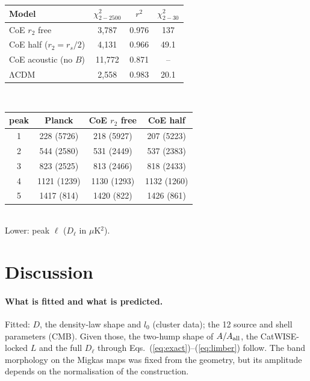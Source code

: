 \documentclass[10pt,twocolumn]{article}
\begin{document}
\par\medskip\noindent\begin{minipage}{\columnwidth}\centering\footnotesize\setlength{\tabcolsep}{4pt}
\label{tab:fit}
\begin{tabular}{lccc}\toprule
Model & $\chi^2_{2-2500}$ & $r^2$ & $\chi^2_{2-30}$\\\midrule
CoE $r_2$ free & 3{,}787 & 0.976 & 137\\
CoE half ($r_2=r_s/2$) & 4{,}131 & 0.966 & 49.1\\
CoE acoustic (no $B$) & 11{,}772 & 0.871 & --\\
ΛCDM & 2{,}558 & 0.983 & 20.1\\\bottomrule
\end{tabular}\\[6pt]
\begin{tabular}{cccc}\toprule
peak & Planck & CoE $r_2$ free & CoE half\\\midrule
1&228 (5726)&218 (5927)&207 (5223)\\
2&544 (2580)&531 (2449)&537 (2383)\\
3&823 (2525)&813 (2466)&818 (2433)\\
4&1121 (1239)&1130 (1293)&1132 (1260)\\
5&1417 (814)&1420 (822)&1426 (861)\\\bottomrule
\end{tabular}\\[2pt]
Lower: peak $\ell$ ($D_\ell$ in $\mu$K$^2$).
\end{minipage}\par\medskip

\section{Discussion}\label{sec:disc}
\paragraph{What is fitted and what is predicted.} Fitted: $D$, the density-law shape and $l_0$ (cluster data); the 12 source and shell parameters (CMB). Given those, the two-hump shape of $A/A_{\rm all}$, the CatWISE-locked $L$ and the full $D_\ell$ through Eqs.~(\ref{eq:exact})--(\ref{eq:limber}) follow. The band morphology on the Migkas maps was fixed from the geometry, but its amplitude depends on the normalisation of the construction.
\end{document}
